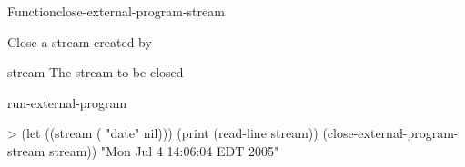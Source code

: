 \documentclass[10pt,twoside,english,pdftex]{article}
\begin{document}

\begin{functiondoc}{Function}{close-external-program-stream}{}
%
%

\fnsyntax

%
\fnpurpose Close a stream created by
\textbf{}

\fnpackage {}

\fnmodule {}

\fnargs
\begin{args}{stream}
\arg[stream] The stream to be closed
\end{args}

\begin{alsos}{run-external-program}
\end{alsos}

%
\fnexample
\begin{example}
> (let ((stream ( "date" nil)))
     (print (read-line stream))
     (close-external-program-stream stream))
"Mon Jul  4 14:06:04 EDT 2005" 
\end{example}

\end{functiondoc}

\end{document}
